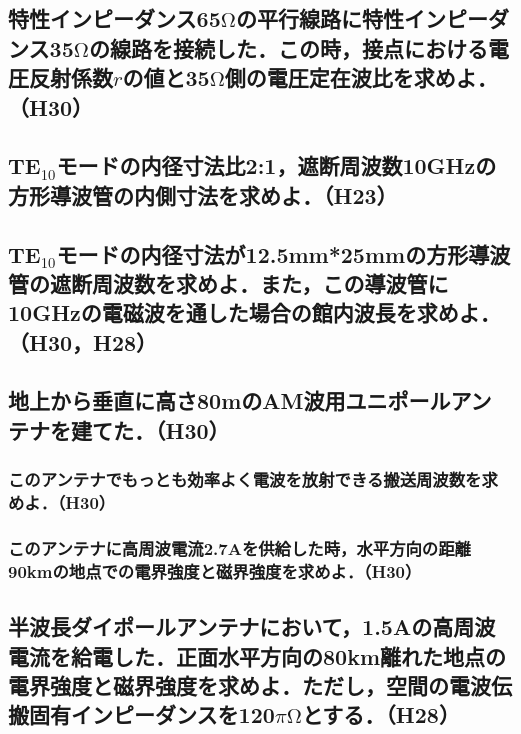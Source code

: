 \newpage
\subsection{特性インピーダンス65$\mathrm{\Omega}$の平行線路に特性インピーダンス35$\mathrm{\Omega}$の線路を接続した．この時，接点における電圧反射係数$r$の値と35$\mathrm{\Omega}$側の電圧定在波比を求めよ．（H30）}
\vspace{7cm}

\subsection{TE$_10$モードの内径寸法比2:1，遮断周波数10GHzの方形導波管の内側寸法を求めよ．（H23）}
\vspace{7cm}

\subsection{TE$_10$モードの内径寸法が12.5mm*25mmの方形導波管の遮断周波数を求めよ．また，この導波管に10GHzの電磁波を通した場合の館内波長を求めよ．（H30，H28）}
\vspace{7cm}

\newpage
\subsection{地上から垂直に高さ80mのAM波用ユニポールアンテナを建てた．（H30）}
\subsubsection{このアンテナでもっとも効率よく電波を放射できる搬送周波数を求めよ．（H30）}
\vspace{7cm}
\subsubsection{このアンテナに高周波電流2.7Aを供給した時，水平方向の距離90kmの地点での電界強度と磁界強度を求めよ．（H30）}
\vspace{7cm}

\subsection{半波長ダイポールアンテナにおいて，1.5Aの高周波電流を給電した．正面水平方向の80km離れた地点の電界強度と磁界強度を求めよ．ただし，空間の電波伝搬固有インピーダンスを120$\pi\mathrm{\Omega}$とする．（H28）}
\vspace{7cm}

